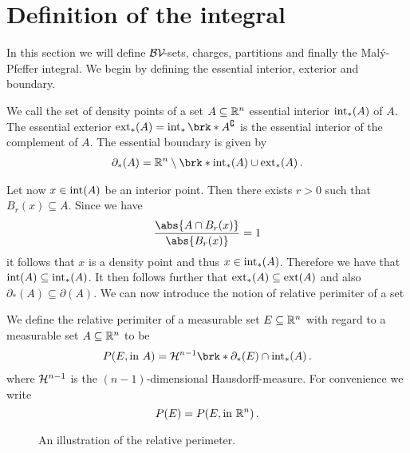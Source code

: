 \section{Definition of the integral}

In this section we will define $\mathcal{BV\!}$-sets, charges, partitions and finally the Malý-Pfeffer integral.
We begin by defining the essential interior, exterior and boundary.

\begin{definition}
We call the set of density points of a set $A\subseteq\mathbb{R}^n$ essential interior $\operatorname{int}_*(A)$ of $A$.
The essential exterior $\exterior_*(A)=\interior_*\brk*{A^\complement}$ is the essential interior of the complement of $A$. The essential boundary is given by
\begin{align*}
	\partial_*(A)=\R^n\setminus\brk*{\interior_*(A)\cup\exterior_*(A)}\,.
\end{align*}
\end{definition}

\noindent Let now $x\in\operatorname{int}(A)$ be an interior point. Then there exists $r>0$ such that $B_r(x)\subseteq A$. Since we have
\begin{align*}
	\frac{\abs{A\cap B_r(x)}}{\abs{B_r(x)}}=1
\end{align*}
it follows that $x$ is a density point and thus $x\in\operatorname{int}_*(A)$. Therefore we have that $\operatorname{int}(A)\subseteq \operatorname{int}_*(A)$. It then follows further that $\operatorname{ext}_*(A)\subseteq\operatorname{ext}(A)$ and also $\partial_*(A)\subseteq\partial (A)$. We can now introduce the notion of relative perimiter of a set 

\begin{definition}
We define the relative perimiter of a measurable set $E\subseteq\mathbb{R}^n$ with regard to a measurable set $A\subseteq\mathbb{R}^n$ to be 
\begin{align*}
	P(E,\text{in }A)=\cH^{n-1}\brk*{\partial_*(E)\cap \interior_*(A)}\,.
\end{align*}
where $\mathcal{H}^{n-1}$ is the $(n-1)$-dimensional Hausdorff-measure. For convenience we write $$P(E)=P(E,\text{in }\mathbb{R}^n)\,.$$
\end{definition}

\begin{wrapfigure}{r}{0.3\textwidth}
\centering
\vspace{-1cm}

\caption{An illustration of the relative perimeter.}
\label{fi:relativePerimeter}
\end{wrapfigure}

